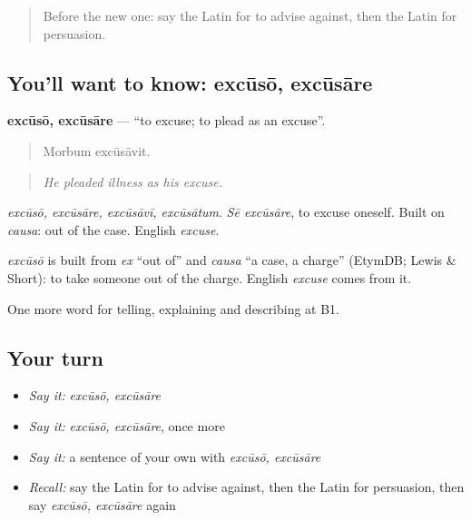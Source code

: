 \label{lesson:LA-C369-excuso}



\begin{quote}
Before the new one: say the Latin for to advise against, then the Latin for persuasion.
\end{quote}

\subsection*{You'll want to know: excūsō, excūsāre}
\textbf{excūsō, excūsāre} — \textquotedblleft{}to excuse; to plead as an excuse\textquotedblright{}.

\begin{quote}
Morbum excūsāvit.
\end{quote}

\begin{quote}
\emph{He pleaded illness as his excuse.}
\end{quote}

\emph{excūsō, excūsāre, excūsāvī, excūsātum}. \emph{Sē excūsāre}, to excuse oneself. Built on \emph{causa}: out of the case. English \emph{excuse}.

\begin{cousinweb}
\emph{excūsō} is built from \emph{ex} \textquotedblleft{}out of\textquotedblright{} and \emph{causa} \textquotedblleft{}a case, a charge\textquotedblright{} (EtymDB; Lewis \& Short): to take someone out of the charge. English \emph{excuse} comes from it.
\end{cousinweb}

\begin{grammarlens}[title={What you've built}]
One more word for telling, explaining and describing at B1.
\end{grammarlens}

\subsection*{Your turn}
\begin{itemize}
\raggedright
  \item \emph{Say it:} \emph{excūsō, excūsāre}
  \item \emph{Say it:} \emph{excūsō, excūsāre}, once more
  \item \emph{Say it:} a sentence of your own with \emph{excūsō, excūsāre}
  \item \emph{Recall:} say the Latin for to advise against, then the Latin for persuasion, then say \emph{excūsō, excūsāre} again
\end{itemize}

